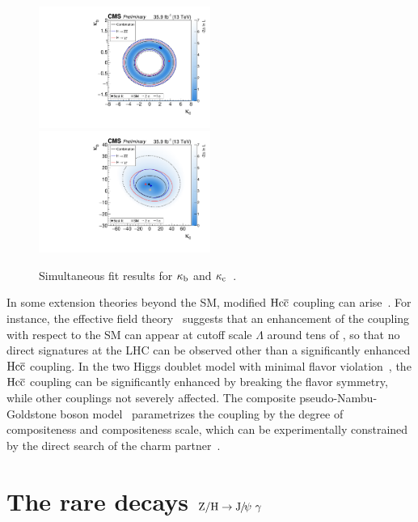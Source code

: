 \begin{figure}[!ht]
\begin{center}
\includegraphics[width=0.5\textwidth]{Fig/CMS-PAS-HIG-17-028_Figure_006-a}~
\includegraphics[width=0.5\textwidth]{Fig/CMS-PAS-HIG-17-028_Figure_006-b}\\
\caption{Simultaneous fit results for $\kappa_{\mathrm{b}}$ and $\kappa_{\mathrm{c}}$~\cite{CMS-PAS-HIG-17-028}. \label{fig:HiggsPt_KappaC_CMS2016}}
\end{center}
\end{figure}

In some extension theories beyond the SM, modified $\mathrm{H} \mathrm{c}\overline{\mathrm{c}}$ coupling can arise~\cite{Delaunay:2013pja}. For instance, the effective field theory~\cite{Buchmuller:1985jz,Weinberg:1980wa,Contino:2013kra} suggests that an enhancement of the coupling with respect to the SM can appear at cutoff scale $\Lambda$ around tens of \TeV, so that no direct signatures at the LHC can be observed other than a significantly enhanced $\mathrm{H} \mathrm{c}\overline{\mathrm{c}}$ coupling. In the two Higgs doublet model with minimal flavor violation~\cite{Trott:2010iz,Jung:2010ik}, the $\mathrm{H} \mathrm{c}\overline{\mathrm{c}}$ coupling can be significantly enhanced by breaking the flavor symmetry, while other couplings not severely affected. The composite pseudo-Nambu-Goldstone boson model~\cite{Giudice:2007fh} parametrizes the coupling by the degree of compositeness and compositeness scale, which can be experimentally constrained by the direct search of the charm partner~\cite{Delaunay:2013pwa}.

\section{The rare decays $\mathrm{Z}/\mathrm{H}\to{\mathrm{J}\hspace{-.08em}/\hspace{-.14em}\psi}\ \gamma$}
